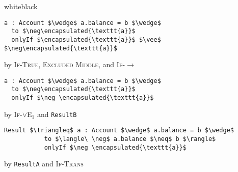 \documentclass[acmsmall,review,anonymous]{acmart}\settopmatter{printfolios=true,printccs=false,printacmref=false}
\begin{document}
\begin{minipage}{\linewidth}
\begin{proofBox}{white}{black}
\footnotesize
\begin{minipage}{0.75\textwidth}
\begin{lstlisting}[language = Chainmail, mathescape=true, frame=single]
a : Account $\wedge$ a.balance = b $\wedge$ 
  to $\neg\encapsulated{\texttt{a}}$ 
  onlyIf $\encapsulated{\texttt{a}}$ $\vee$ $\neg\encapsulated{\texttt{a}}$
\end{lstlisting}
\end{minipage}
\begin{minipage}{0.24\textwidth}
\scriptsize
\hfill by \textsc{If-True}, \textsc{Excluded Middle}, and \textsc{If}-$\longrightarrow$
\end{minipage}
\begin{minipage}{0.75\textwidth}
\begin{lstlisting}[language = Chainmail, mathescape=true]
a : Account $\wedge$ a.balance = b $\wedge$ 
  to $\neg\encapsulated{\texttt{a}}$  
  onlyIf $\neg \encapsulated{\texttt{a}}$
\end{lstlisting}
\end{minipage}
\begin{minipage}{0.24\textwidth}
\scriptsize
\hfill by \textsc{If}-$\vee$\textsc{E}$_1$ and \texttt{ResultB}
\end{minipage}
\begin{minipage}{0.75\textwidth}
\begin{lstlisting}[language = Chainmail, mathescape=true, frame=none]
Result $\triangleq$ a : Account $\wedge$ a.balance = b $\wedge$ 
           to $\langle\ \neg$ a.balance $\neq$ b $\rangle$ 
           onlyIf $\neg \encapsulated{\texttt{a}}$
\end{lstlisting}
\end{minipage}
\begin{minipage}{0.24\textwidth}
\scriptsize
\hfill by \texttt{ResultA} and \textsc{If-Trans}
\end{minipage}
\end{proofBox}
\end{minipage}
\end{document}
